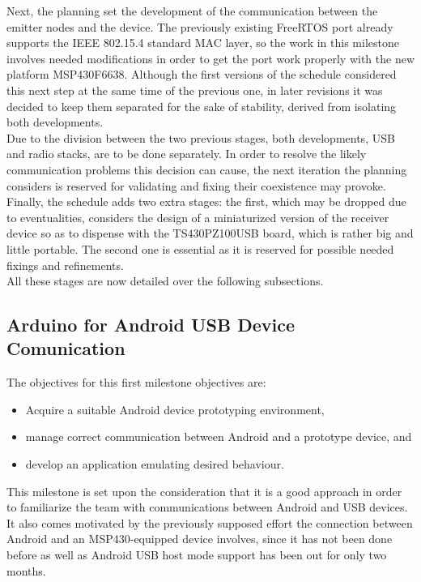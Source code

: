 	Next, the planning set the development of the communication between the emitter nodes and the device.
	The previously existing FreeRTOS port already supports the IEEE 802.15.4 standard MAC layer, so the
	work in this milestone involves needed modifications in order to get the port work properly with
	the new platform MSP430F6638. Although the first versions of the schedule considered this next step 
	at the same time of the previous one, in later revisions it was decided to keep them separated for 
	the sake of stability, derived from isolating both developments.\\
	
	Due to the division between the two previous stages, both developments, USB and radio stacks, are
	to be done separately. In order to resolve the likely communication problems this decision can cause,
	the next iteration the planning considers is reserved for validating and fixing their coexistence
	may provoke.\\
	
	Finally, the schedule adds two extra stages: the first, which may be dropped due to eventualities,
	considers the design of a miniaturized version of the receiver device so as to dispense with the
	TS430PZ100USB board, which is rather big and little portable. The second one is essential as it
	is reserved for possible needed fixings and refinements.\\
	
	All these stages are now detailed over the following subsections.\\

	\subsection{Arduino for Android USB Device Comunication}
	\label{ssec:Arduino.USB}
		The objectives for this first milestone objectives are:
		\begin{itemize}
			\item Acquire a suitable Android device prototyping environment, 
			\item manage correct communication between Android and a prototype device, and
			\item develop an application emulating desired behaviour.
		\end{itemize}
			
		This milestone is set upon the consideration that it is a good approach in order to familiarize
		the team with communications between Android and USB devices. It also comes motivated by the
		previously supposed effort the connection between Android and an MSP430-equipped device involves,
		since it has not been done before as well as Android USB host mode support has been out for only
		two months.\\

